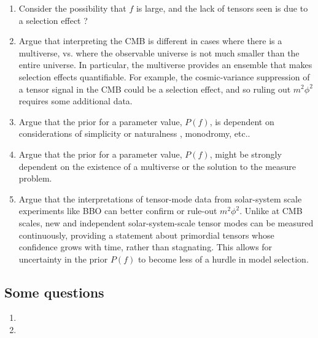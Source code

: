 \documentclass[aps,amsfonts,amsmath,prd,preprint,nofootinbib]{revtex4}
\begin{document}
\begin{appendix}
\begin{enumerate}
\item Consider the possibility that $f$ is large, and the lack of tensors seen is due to a selection effect ?

\item Argue that interpreting the CMB is different in cases where there is a multiverse, vs. where the observable universe is not much smaller than the entire universe.  In particular, the multiverse provides an ensemble
that makes selection effects quantifiable.  For example, the cosmic-variance suppression of a tensor signal in the CMB could be a selection effect, and so ruling out $m^2\phi^2$ requires some additional data.  



\item Argue that the prior for a parameter value, $P(f)$, is dependent on considerations of simplicity or naturalness \cite{Musoke:2017frr}, monodromy, etc..

\item Argue that the prior for a parameter value, $P(f)$, might be strongly dependent on the existence of a multiverse or the solution to the measure problem.


\item Argue that the interpretations of tensor-mode data from solar-system scale experiments like BBO can better confirm or rule-out $m^2\phi^2$.  Unlike at CMB scales, new and independent solar-system-scale tensor modes can be measured continuously, providing a statement about primordial tensors whose confidence grows with time, rather than stagnating.  This allows for uncertainty in the prior $P(f)$ to become less of a hurdle in model selection.


\end{enumerate}

\subsection{Some questions}
 
 \begin{enumerate}
 \item
 \item 
 \end{enumerate}





\end{appendix}




  
\end{document}
